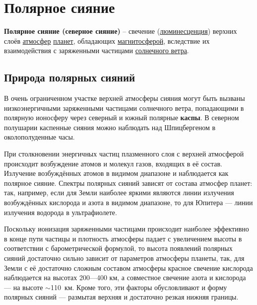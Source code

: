 \documentclass[a4paper,14pt]{article}
\newcommand{\mybibexclude}[1]{\addtocategory{fullcited}{#1}}
\begin{document}
\section*{Полярное сияние\mybibexclude{WikiAurora}}

\textbf{Полярное сияние (северное сияние)} -- свечение (\href{https://ru.wikipedia.org/wiki/%D0%9B%D1%8E%D0%BC%D0%B8%D0%BD%D0%B5%D1%81%D1%86%D0%B5%D0%BD%D1%86%D0%B8%D1%8F}{люминесценция}) верхних слоёв \href{https://ru.wikipedia.org/wiki/%D0%90%D1%82%D0%BC%D0%BE%D1%81%D1%84%D0%B5%D1%80%D0%B0}{атмосфер} \href{https://ru.wikipedia.org/wiki/%D0%9F%D0%BB%D0%B0%D0%BD%D0%B5%D1%82%D0%B0}{планет}, обладающих \href{https://ru.wikipedia.org/wiki/%D0%9C%D0%B0%D0%B3%D0%BD%D0%B8%D1%82%D0%BE%D1%81%D1%84%D0%B5%D1%80%D0%B0}{магнитосферой}, вследствие их взаимодействия с заряженными частицами \href{https://ru.wikipedia.org/wiki/%D0%A1%D0%BE%D0%BB%D0%BD%D0%B5%D1%87%D0%BD%D1%8B%D0%B9_%D0%B2%D0%B5%D1%82%D0%B5%D1%80}{солнечного ветра}.

\tableofcontents

\subsection*{Природа полярных сияний}

В очень ограниченном участке верхней атмосферы сияния могут быть
вызваны низкоэнергичными заряженными частицами солнечного ветра,
попадающими в полярную ионосферу через северный и южный полярные \textbf{каспы}. В северном полушарии каспенные сияния можно наблюдать
над Шпицбергеном в околополуденные часы.

При столкновении энергичных частиц плазменного слоя с верхней
атмосферой происходит возбуждение атомов и молекул газов, входящих
в её состав. Излучение возбуждённых атомов в видимом диапазоне и
наблюдается как полярное сияние. Спектры полярных сияний зависят
от состава атмосфер планет: так, например, если для Земли наиболее
яркими являются линии излучения возбуждённых кислорода и азота в
видимом диапазоне, то для Юпитера — линии излучения водорода в
ультрафиолете.

Поскольку ионизация заряженными частицами происходит наиболее
эффективно в конце пути частицы и плотность атмосферы падает с увеличением высоты в соответствии с барометрической формулой, то высота
появлений полярных сияний достаточно сильно зависит от параметров
атмосферы планеты, так, для Земли с её достаточно сложным составом
атмосферы красное свечение кислорода наблюдается на высотах 200---400
км, а совместное свечение азота и кислорода --- на высоте $\sim$110~км.
Кроме того, эти факторы обусловливают и форму полярных сияний —
размытая верхняя и достаточно резкая нижняя границы.
\end{document}
